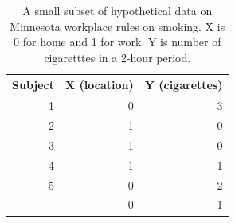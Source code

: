 \documentclass[
]{krantz}
\begin{document}
\begin{table}

\caption{\label{tab:ex3chp4}A small subset of hypothetical data on Minnesota workplace rules on smoking.  X is 0 for home and 1 for work.  Y is number of cigaretttes in a 2-hour period.}
\centering
\begin{tabular}[t]{rrr}
\toprule
Subject & X (location) & Y (cigarettes)\\
\midrule
1 & 0 & 3\\
2 & 1 & 0\\
3 & 1 & 0\\
4 & 1 & 1\\
5 & 0 & 2\\
\addlinespace
6 & 0 & 1\\
\bottomrule
\end{tabular}
\end{table}
\end{document}
